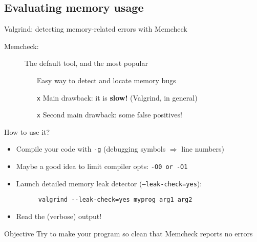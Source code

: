 \documentclass[10pt,xcolor=table]{beamer}
\begin{document}

\subsection{Evaluating memory usage}

\begin{frame}[fragile]{Valgrind: detecting memory-related errors with
    Memcheck}

  \begin{description}
  \item[Memcheck:] The default tool, and the most popular
    \begin{itemize}
    \item[\checkmark] Easy way to detect and locate memory bugs
    \item[{\tt x}] Main drawback: it is {\bf slow!} (Valgrind, in general)
    \item[{\tt x}] Second main drawback: some false positives!
    \end{itemize}
  \end{description}

  \pause

  How to use it?
  \begin{itemize}
  \item Compile your code with {\tt -g} (debugging symbols
    $\Rightarrow$ line numbers)
  \item Maybe a good idea to limit compiler opts: {\tt -O0 or -O1}
  \item Launch detailed memory leak detector ({\tt --leak-check=yes}):
    \begin{lstlisting}
      valgrind --leak-check=yes myprog arg1 arg2
    \end{lstlisting}
  \item Read the (verbose) output!
  \end{itemize}

  \pause

  \begin{exampleblock}{Objective}
    Try to make your program so clean that Memcheck reports no errors
  \end{exampleblock}
\end{frame}
\end{document}
